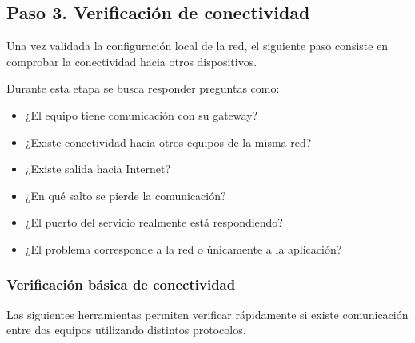 \documentclass[a4paper,10pt]{article}
\begin{document}
\subsection{Paso 3. Verificación de conectividad}

Una vez validada la configuración local de la red, el siguiente paso consiste en
comprobar la conectividad hacia otros dispositivos.

Durante esta etapa se busca responder preguntas como:

\begin{itemize}
\item ¿El equipo tiene comunicación con su gateway?
\item ¿Existe conectividad hacia otros equipos de la misma red?
\item ¿Existe salida hacia Internet?
\item ¿En qué salto se pierde la comunicación?
\item ¿El puerto del servicio realmente está respondiendo?
\item ¿El problema corresponde a la red o únicamente a la aplicación?
\end{itemize}


\subsubsection{Verificación básica de conectividad}

Las siguientes herramientas permiten verificar rápidamente si existe
comunicación entre dos equipos utilizando distintos protocolos.
\end{document}
